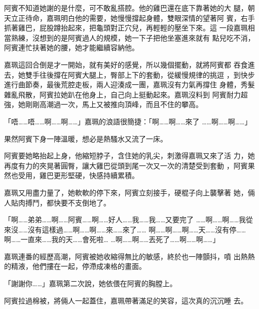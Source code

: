 阿賓不知道她謝的是什麼，可不敢亂搭腔。他的雞巴還在底下靠著她的大
腿，朝天立正待命，嘉珮明白他的需要，她慢慢撐起身體，雙眼深情的望著阿
賓，右手抓著雞巴，屁股蹲抬起來，把龜頭對正穴兒，再輕輕的壓坐下來。這
一段嘉珮相當熟練，沒想到的是阿賓過人的規模，她一下子把他坐塞進來就有
點兒吃不消，阿賓連忙扶著她的腰，她才能繼續容納他。

嘉珮這回合倒是才一開始，就有美好的感覺，所以幾個擺動，就將阿賓都
吞食進去，她雙手往後撐在阿賓大腿上，臀部上下的套動，從緩慢規律的挑逗
，到快步進行曲節奏，最後荒腔走板，兩人迎湊成一團，嘉珮沒有力氣再撐住
身體，秀髮雜亂飛散，阿賓拉她趴在他身上，自己向上挺動起來。嘉珮沒料到
阿賓耐力超強，她剛剛高潮過一次，馬上又被推向頂峰，而且不住的攀高。

「唔……唔……啊……啊……」嘉珮的浪語很簡捷：「啊……啊……來了
……啊……啊……」

果然阿賓下身一陣溫暖，想必是熱騷水又流了一床。

阿賓要她略抬起上身，他縮短脖子，含住她的乳尖，刺激得嘉珮又來了活
力，她再度有力的夾晃著圓臀，讓大雞巴從頭到尾一次又一次的清楚受到套動
，阿賓果然也受用，雞巴更形堅硬，快感持續累積。

嘉珮又用盡力量了，她軟軟的停下來，阿賓立刻接手，硬棍子向上襲擊著
她，倆人貼肉搏鬥，都快要不支倒地了。

「啊……弟弟……啊……阿賓……啊……好人……我……我……又要完了
……啊……啊……我從來沒……沒有這樣過……啊……啊……來……來了……
啊……啊……啊……天……沒有停……啊……一直來……我的天……會死啦…
…啊……啊……丟死了……啊……啊……」

嘉珮連番的經歷高潮，阿賓被她收縮得無比的敏感，終於也一陣顫抖，噴
出熱熱的精液，他們摟在一起，停滯成凍格的畫面。

「謝謝你……」嘉珮第二次說，她依偎在阿賓的胸膛上。

阿賓拉過棉被，將倆人一起蓋住，嘉珮帶著滿足的笑容，這次真的沉沉睡
去。











